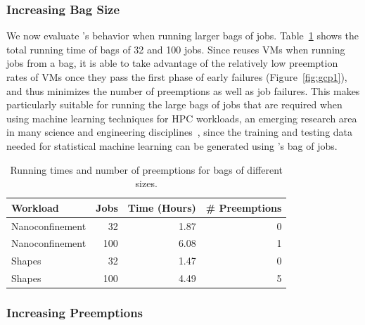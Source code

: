 \subsubsection{Increasing Bag Size}

We now evaluate \sysname's behavior when running larger bags of jobs.
Table~\ref{tab:100-jobs} shows the total running time of bags of 32 and 100 jobs.
Since \sysname reuses VMs when running jobs from a bag, it is able to take advantage of the relatively low preemption rates of VMs once they pass the first phase of early failures (Figure~\ref{fig:gcp1}), and thus minimizes the number of preemptions as well as job failures. 
This makes \sysname particularly suitable for running the large bags of jobs that are required when using machine learning techniques for HPC workloads, an emerging research area in many science and engineering disciplines~\cite{ml.atomic2017,melko2017,sam2017,fu2017,long2015machine,ferguson2017machine,ward2018matminer,jcs1,jcs2,fox2019learning}, since the training and testing data needed for statistical machine learning can be generated using \sysname's bag of jobs. 


\begin{table}
  \begin{tabular}{|l|r|r|r|}
    \hline
    Workload & Jobs & Time (Hours) & \# Preemptions \\
    \hline
    Nanoconfinement & 32  & 1.87 & 0 \\
    Nanoconfinement & 100  & 6.08 & 1 \\
    \hline
    Shapes & 32 & 1.47 & 0 \\
    Shapes & 100 & 4.49 & 5  \\  
    \hline
  \end{tabular}
  \caption{Running times and number of preemptions for bags of different sizes. }
  \label{tab:100-jobs}
  \vspace*{\myfigspace}
  \vspace*{\myfigspace}
\end{table}



\subsubsection{Increasing Preemptions}

